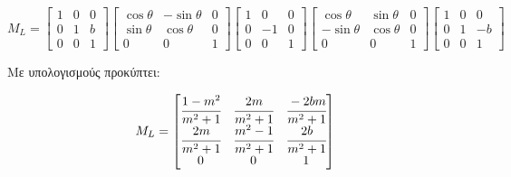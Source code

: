 \begin{solution}
\[
M_L = \begin{bmatrix}
1 & 0 & 0 \\
0 & 1 & b \\
0 & 0 & 1
\end{bmatrix}
\begin{bmatrix}
\cos\theta & -\sin\theta & 0 \\
\sin\theta & \cos\theta & 0 \\
0 & 0 & 1
\end{bmatrix}
\begin{bmatrix}
1 & 0 & 0 \\
0 & -1 & 0 \\
0 & 0 & 1
\end{bmatrix}
\begin{bmatrix}
\cos\theta & \sin\theta & 0 \\
-\sin\theta & \cos\theta & 0 \\
0 & 0 & 1
\end{bmatrix}
\begin{bmatrix}
1 & 0 & 0 \\
0 & 1 & -b \\
0 & 0 & 1
\end{bmatrix}
\]

Με υπολογισμούς προκύπτει:

\[
M_L = \begin{bmatrix}
\cfrac{1 - m^2}{m^2 + 1} & \cfrac{2m}{m^2 + 1} & \cfrac{-2bm}{m^2 + 1} \\
\cfrac{2m}{m^2 + 1} & \cfrac{m^2 - 1}{m^2 + 1} & \cfrac{2b}{m^2 + 1} \\
0 & 0 & 1
\end{bmatrix}
\]
\end{solution}